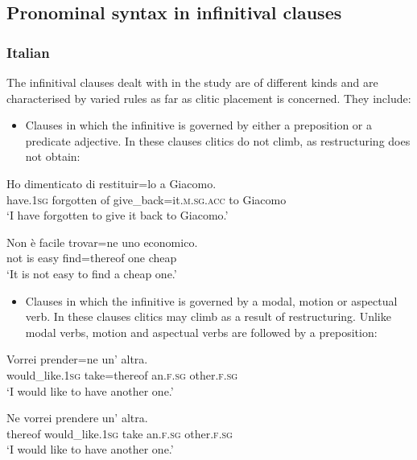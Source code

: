 \documentclass[output=paper,modfonts,nonflat,newtxmath]{langsci/langscibook}
\begin{document}
\subsection{{Pronominal} {syntax} {in} {infinitival} {clauses}} %
\label{sec:sciutti:2.2}

\subsubsection{Italian} %

The infinitival clauses dealt with in the study are of different kinds and are characterised by varied rules as far as clitic placement is concerned. They include:

\begin{itemize}
\item
Clauses in which the infinitive is governed by either a preposition or a predicate adjective. In these clauses clitics do not climb, as restructuring does not obtain:

\end{itemize}

\ea \label{ex:sciutti:3}
    \gll Ho dimenticato di restituir=lo a Giacomo.\\
        have.\textsc{1sg} forgotten of give\_back=it.\textsc{m.sg.acc} to Giacomo\\
    \glt  ‘I have forgotten to give it back to Giacomo.’
\z

\ea \label{ex:sciutti:4}
    \gll Non è facile trovar=ne uno economico.\\
         not is easy find=thereof one cheap\\
    \glt  ‘It is not easy to find a cheap one.’
\z


\begin{itemize}
\item
Clauses in which the infinitive is governed by a modal, motion or aspectual verb. In these clauses clitics may climb as a result of restructuring. Unlike modal verbs, motion and aspectual verbs are followed by a preposition:

\end{itemize}

\ea \label{ex:sciutti:5}
    \begin{xlist}
    \ex \label{ex:sciutti:5a}
    \gll Vorrei prender=ne un’ altra.\\
         would\_like.\textsc{1sg} take=thereof an.\textsc{f.sg} other.\textsc{f.sg}\\
    \glt  ‘I would like to have another one.’

    \ex \label{ex:sciutti:5b}
    \gll Ne vorrei prendere un’ altra.\\
         thereof would\_like.\textsc{1sg} take an.\textsc{f.sg} other.\textsc{f.sg}\\
    \glt  ‘I would like to have another one.’
    \end{xlist}
\z
\end{document}
